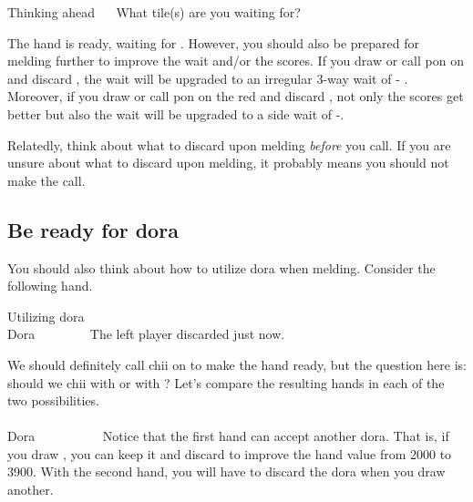 \begin{itembox}[r]{Thinking ahead}
\bp
{}~~\bai\bai\rbai
\ep
\vspace{-10pt}
What tile(s) are you waiting for?
\end{itembox}
The hand is ready, waiting for {\LARGE{}}. However, you should also be prepared for melding further to improve the wait and/or the scores. 
If you draw or call {\jap pon} on {\LARGE{}} and discard {\LARGE{}}, the wait will be upgraded to an irregular 3-way wait of {\LARGE{}- }. Moreover, if you draw or call {\jap pon} on the red {\LARGE\rfw} and discard {\LARGE{}}, not only the scores get better but also the wait will be upgraded to a side wait of {\LARGE{}-}.

\bigskip
Relatedly, think about what to discard upon melding \emph{before} you call. 
If you are unsure about what to discard upon melding, it probably means you should not make the call. 

\subsection{Be ready for {\jap dora}}
You should also think about how to utilize {\jap dora} when melding. Consider the following hand. 

\begin{itembox}[r]{Utilizing {\jap dora}}
\bp
{}~\fa\rfa\fa~~\\
\hfill\footnotesize{{\jap Dora}~~~~~~~~}
\ep
\vspace{-20pt}
The left player discarded {\LARGE{}} just now.
\end{itembox}
\noindent We should definitely call {\jap chii} on {\LARGE{}} to make the hand ready, but the question here is: should we {\jap chii} with {\LARGE{}} or with {\LARGE{}}? Let's compare the resulting hands in each of the two possibilities. 
\bp
{}~~\fa\rfa\fa~\\
~~\fa\rfa\fa~\\
\hfill\footnotesize{{\jap Dora}~~~~~~~~~~}
\ep
Notice that the first hand can accept another {\jap dora}. That is, if you draw {\LARGE{}}, you can keep it and discard {\LARGE{}} to improve the hand value from 2000 to 3900.
With the second hand, you will have to discard the {\jap dora} when you draw another. 

